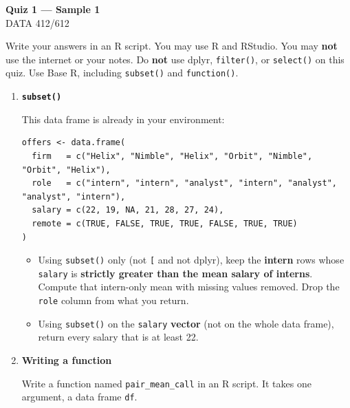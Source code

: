 \documentclass[11pt]{article}
\begin{document}
\begin{center}
{\LARGE\bfseries Quiz 1 --- Sample 1}\\[0.35em]
DATA 412/612
\end{center}

\vspace{0.4em}

Write your answers in an R script. You may use R and RStudio.
You may \textbf{not} use the internet or your notes.
Do \textbf{not} use dplyr, \texttt{filter()}, or \texttt{select()} on this quiz.
Use Base R, including \texttt{subset()} and \texttt{function()}.

\begin{enumerate}
\item \textbf{\texttt{subset()}}

This data frame is already in your environment:

\begin{lstlisting}
offers <- data.frame(
  firm   = c("Helix", "Nimble", "Helix", "Orbit", "Nimble", "Orbit", "Helix"),
  role   = c("intern", "intern", "analyst", "intern", "analyst", "analyst", "intern"),
  salary = c(22, 19, NA, 21, 28, 27, 24),
  remote = c(TRUE, FALSE, TRUE, TRUE, FALSE, TRUE, TRUE)
)
\end{lstlisting}

\begin{itemize}
  \item Using \texttt{subset()} only (not \texttt{[} and not dplyr), keep the
        \textbf{intern} rows whose \texttt{salary} is \textbf{strictly greater than the
        mean salary of interns}. Compute that intern-only mean with missing values
        removed. Drop the \texttt{role} column from what you return.
  \item Using \texttt{subset()} on the \texttt{salary} \textbf{vector}
        (not on the whole data frame), return every salary that is at least 22.
\end{itemize}

\item \textbf{Writing a function}

Write a function named \texttt{pair\_mean\_call} in an R script. It takes one
argument, a data frame \texttt{df}.


\end{enumerate}
\end{document}
